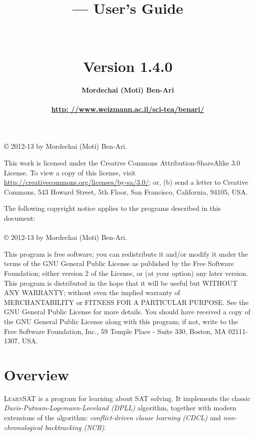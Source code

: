 \documentclass[11pt]{article}
\title{\bfseries \ls{} --- User's Guide\\\mbox{}\\\mbox{}\\
\bfseries\normalsize Version 1.4.0}
\author{\bfseries Mordechai (Moti) Ben-Ari\\\mbox{}\\
\url{http: //www.weizmann.ac.il/sci-tea/benari/}}
\newcommand*{\ls}{\textsc{LearnSAT}}
\begin{document}
\maketitle

\thispagestyle{empty}

\vspace*{\fill}

\begin{center}
\copyright{} 2012-13 by Mordechai (Moti) Ben-Ari.
\end{center}
This work is licensed under the Creative Commons Attribution-ShareAlike 3.0
License. To view a copy of this license, visit
\url{http://creativecommons.org/licenses/by-sa/3.0/}; or, (b) send a letter
to Creative Commons, 543 Howard Street, 5th Floor, San Francisco,
California, 94105, USA.

\bigskip\bigskip

 
\begin{center}
The following copyright notice applies to the programs described in this
document:\mbox{}\\\mbox{}\\
\copyright{} 2012-13 by Mordechai (Moti) Ben-Ari.
\end{center}

This program is free software; you can redistribute it and/or
modify it under the terms of the GNU General Public License
as published by the Free Software Foundation; either version 2
of the License, or (at your option) any later version.
This program is distributed in the hope that it will be useful
but WITHOUT ANY WARRANTY; without even the implied warranty of
MERCHANTABILITY or FITNESS FOR A PARTICULAR PURPOSE.
See the GNU General Public License for more details.
You should have received a copy of the GNU General Public License
along with this program; if not, write to the Free Software
Foundation, Inc., 59 Temple Place - Suite 330, Boston, MA
02111-1307, USA.

\setcounter{page}{0}
\newpage

\section{Overview}

\ls{} is a program for learning about SAT solving. It implements the
classic \emph{Davis-Putnam-Logemann-Loveland (DPLL)} algorithm, together
with modern extensions of the algorithm: \emph{conflict-driven clause
learning (CDCL)} and \emph{non-chronological backtracking (NCB)}.
\end{document}
